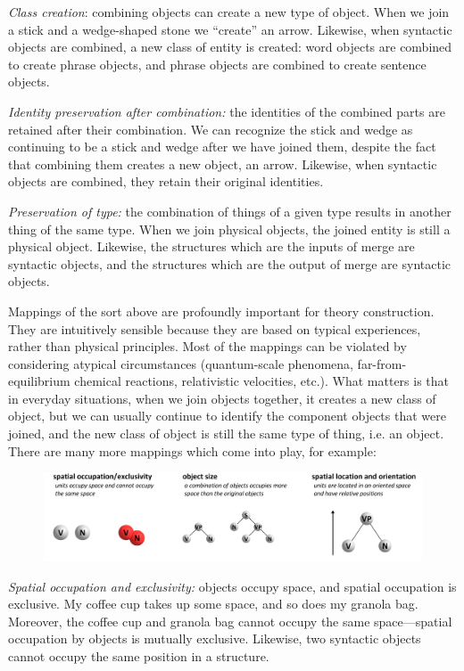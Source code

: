 \textit{Class creation}: combining objects can create a new type of object. When we join a stick and a wedge-shaped stone we “create” an arrow. Likewise, when syntactic objects are combined, a new class of entity is created: word objects are combined to create phrase objects, and phrase objects are combined to create sentence objects. 

\textit{Identity preservation after combination:} the identities of the combined parts are retained after their combination. We can recognize the stick and wedge as continuing to be a stick and wedge after we have joined them, despite the fact that combining them creates a new object, an arrow. Likewise, when syntactic objects are combined, they retain their original identities.

\textit{Preservation of type:} the combination of things of a given type results in another thing of the same type. When we join physical objects, the joined entity is still a physical object. Likewise, the structures which are the inputs of merge are syntactic objects, and the structures which are the output of merge are syntactic objects.

  Mappings of the sort above are profoundly important for theory construction. They are intuitively sensible because they are based on typical experiences, rather than physical principles. Most of the mappings can be violated by considering atypical circumstances (quantum-scale phenomena, far-from-equilibrium chemical reactions, relativistic velocities, etc.). What matters is that in everyday situations, when we join objects together, it creates a new class of object, but we can usually continue to identify the component objects that were joined, and the new class of object is still the same type of thing, i.e. an object. There are many more mappings which come into play, for example:

  
\begin{figure}
\includegraphics[width=\textwidth]{figures/Tilsen-img30.png}
\caption{\missingcaption}
\label{fig:3:2}
\end{figure}
 

\textit{Spatial occupation and exclusivity:} objects occupy space, and spatial occupation is exclusive. My coffee cup takes up some space, and so does my granola bag. Moreover, the coffee cup and granola bag cannot occupy the same space—spatial occupation by objects is mutually exclusive. Likewise, two syntactic objects cannot occupy the same position in a structure. 

